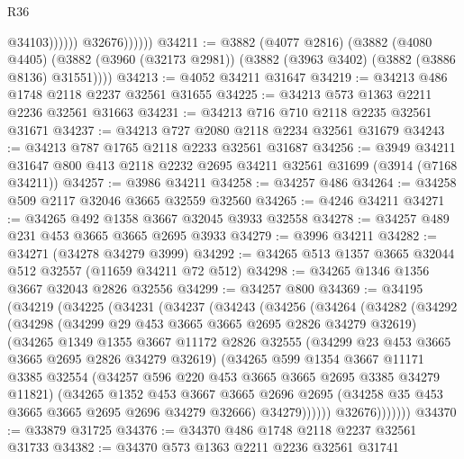 \begin{lexlean}{R36}
\begin{coremodule}
                            @34103))))))
                @32676))))))
@34211 := @3882
    (@4077 @2816)
    (@3882
      (@4080 @4405)
      (@3882 (@3960 (@32173 @2981)) (@3882 (@3963 @3402) (@3882 (@3886 @8136) @31551))))
@34213 := @4052 @34211 @31647
@34219 := @34213 @486 @1748 @2118 @2237 @32561 @31655
@34225 := @34213 @573 @1363 @2211 @2236 @32561 @31663
@34231 := @34213 @716 @710 @2118 @2235 @32561 @31671
@34237 := @34213 @727 @2080 @2118 @2234 @32561 @31679
@34243 := @34213 @787 @1765 @2118 @2233 @32561 @31687
@34256 := @3949
    @34211
    @31647
    @800
    @413
    @2118
    @2232
    @2695
    @34211
    @32561
    @31699
    (@3914 (@7168 @34211))
@34257 := @3986 @34211
@34258 := @34257 @486
@34264 := @34258 @509 @2117 @32046 @3665 @32559 @32560
@34265 := @4246 @34211
@34271 := @34265 @492 @1358 @3667 @32045 @3933 @32558
@34278 := @34257 @489 @231 @453 @3665 @3665 @2695 @3933
@34279 := @3996 @34211
@34282 := @34271 (@34278 @34279 @3999)
@34292 := @34265 @513 @1357 @3665 @32044 @512 @32557 (@11659 @34211 @72 @512)
@34298 := @34265 @1346 @1356 @3667 @32043 @2826 @32556
@34299 := @34257 @800
@34369 := @34195
    (@34219
      (@34225
        (@34231
          (@34237
            (@34243
              (@34256
                (@34264
                  (@34282
                    (@34292
                      (@34298
                        (@34299 @29 @453 @3665 @3665 @2695 @2826 @34279 @32619)
                        (@34265
                          @1349
                          @1355
                          @3667
                          @11172
                          @2826
                          @32555
                          (@34299 @23 @453 @3665 @3665 @2695 @2826 @34279 @32619)
                          (@34265
                            @599
                            @1354
                            @3667
                            @11171
                            @3385
                            @32554
                            (@34257 @596 @220 @453 @3665 @3665 @2695 @3385 @34279 @11821)
                            (@34265
                              @1352
                              @453
                              @3667
                              @3665
                              @2696
                              @2695
                              (@34258 @35 @453 @3665 @3665 @2695 @2696 @34279 @32666)
                              @34279))))))
                  @32676)))))))
@34370 := @33879 @31725
@34376 := @34370 @486 @1748 @2118 @2237 @32561 @31733
@34382 := @34370 @573 @1363 @2211 @2236 @32561 @31741

\end{coremodule}
\end{lexlean}
